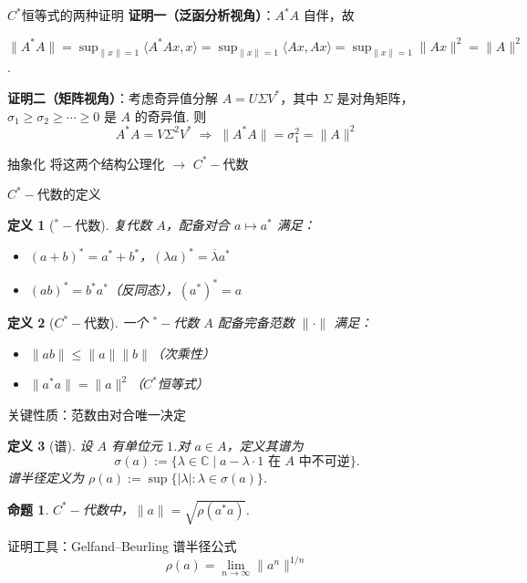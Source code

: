 \documentclass[notheorems,11pt]{beamer}
\theoremstyle{plain}
\numberwithin{theorem}{section}
\newtheorem{definition}{定义}
\numberwithin{lemma}{section}
\newtheorem{proposition}{命题}
\numberwithin{corollary}{section}
\theoremstyle{example}
\begin{document}
\begin{frame}{$C^*$恒等式的两种证明}
  \textbf{证明一（泛函分析视角）}：$A^*A$ 自伴，故\par
  {\small$\|A^*A\| = \sup_{\|x\|=1}\langle A^*Ax,x\rangle =\sup_{\|x\|=1}\langle Ax,Ax\rangle= \sup_{\|x\|=1}\|Ax\|^2 = \|A\|^2$.}\par
  \pause
  \medskip
  \textbf{证明二（矩阵视角）}：考虑奇异值分解 $A = U\Sigma V^*$，其中 $\Sigma$ 是对角矩阵，$\sigma_1 \geq \sigma_2 \geq \cdots \geq 0$ 是 $A$ 的奇异值.
  则
  \begin{equation*}
    A^*A = V\Sigma^2 V^* \;\Rightarrow\; \|A^*A\| = \sigma_1^2 = \|A\|^2
  \end{equation*}
  \pause
  \begin{block}{抽象化}
    将这两个结构公理化 $\longrightarrow$ \alert{$C^*-\!$代数}
  \end{block}
\end{frame}

\begin{frame}{$C^*-\!$代数的定义}
  \begin{definition}[${}^*-\!$代数]
    复代数 $A$，配备对合 $a \mapsto a^*$ 满足：
    \begin{itemize}
      \item $(a+b)^* = a^*+b^*$，$(\lambda a)^* = \overline{\lambda}a^*$
      \item $(ab)^* = b^*a^*$（反同态），$(a^*)^* = a$
    \end{itemize}
  \end{definition}
  \pause
  \begin{definition}[$C^*-\!$代数]
    一个 ${}^*-\!$代数 $A$ 配备完备范数 $\|\cdot\|$ 满足：
    \begin{itemize}
      \item $\|ab\| \le \|a\|\|b\|$（次乘性）
      \item $\|a^*a\| = \|a\|^2$（\alert{$C^*$恒等式}）
    \end{itemize}
  \end{definition}
\end{frame}

\begin{frame}{关键性质：范数由对合唯一决定}
  \begin{definition}[谱]
    设 $A$ 有单位元 $1$.对 $a \in A$，定义其谱为
\begin{equation*}
    \sigma(a) := \{\lambda \in \mathbb{C} \mid a - \lambda \cdot 1 \text{ 在 } A \text{ 中不可逆}\}.
\end{equation*}
谱半径定义为 $\rho(a) := \sup\{|\lambda| : \lambda \in \sigma(a)\}$.
  \end{definition}
  \begin{proposition}
    $C^*-\!$代数中，$\|a\| = \sqrt{\rho(a^*a)}$.
  \end{proposition}
  \pause
  证明工具：\alert{Gelfand--Beurling 谱半径公式}
  \begin{equation*}
    \rho(a) = \lim_{n\to\infty} \|a^n\|^{1/n}
  \end{equation*}
\end{frame}
\end{document}
